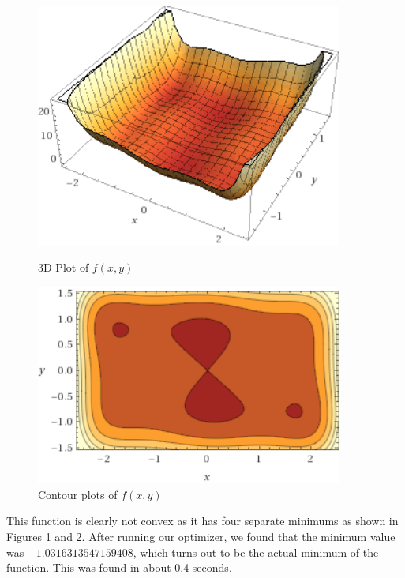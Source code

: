 \documentclass{article}
\begin{document}
\begin{figure}
	\centering
	\begin{minipage}{0.45\textwidth}
		\centering
		\includegraphics[width=0.9\textwidth]{plot1}
		\caption{3D Plot of $f(x,y)$}
	\end{minipage}\hfill
	\begin{minipage}{0.45\textwidth}
		\centering
		\includegraphics[width=0.9\textwidth]{plot2} %
		\caption{Contour plots of $f(x,y)$}
	\end{minipage}
\end{figure}

This function is clearly not convex as it has four separate minimums as shown in Figures 1 and 2. After running our optimizer, we found that the minimum value was $-1.0316313547159408$, which turns out to be the actual minimum of the function. This was found in about 0.4 seconds.
\end{document}

